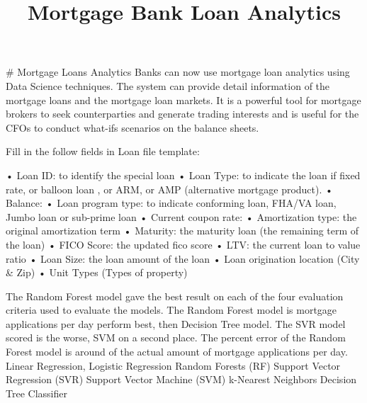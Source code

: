 \documentclass[11pt]{article}
\title{Mortgage Bank Loan Analytics}
\begin{document}
    
    
    \maketitle
    
    

    # Mortgage Loans Analytics
Banks can now use mortgage loan analytics using Data Science techniques. The system can provide detail information of the mortgage loans and the mortgage loan markets. It is a powerful tool for mortgage brokers to seek counterparties and generate trading interests and is useful for the CFOs to conduct what-ifs scenarios on the balance sheets.

Fill in the follow fields in Loan file template: 

•	Loan ID: to identify the special loan
•	Loan Type: to indicate the loan if fixed rate, or balloon loan , or ARM, or AMP (alternative mortgage product).
•	Balance:
•	Loan program type: to indicate conforming loan, FHA/VA loan, Jumbo loan or sub-prime loan
•	Current coupon rate:
•	Amortization type: the original amortization term
•	Maturity: the maturity loan (the remaining term of the loan)
•	FICO Score: the updated fico score
•	LTV: the current loan to value ratio
•	Loan Size: the loan amount of the loan
•	Loan origination location (City & Zip)
•	Unit Types (Types of property)

    The Random Forest model gave the best result on each of the four
evaluation criteria used to evaluate the models. The Random Forest model
is mortgage applications per day perform best, then Decision Tree model.
The SVR model scored is the worse, SVM on a second place. The percent
error of the Random Forest model is around of the actual amount of
mortgage applications per day. Linear Regression, Logistic Regression
Random Forests (RF) Support Vector Regression (SVR) Support Vector
Machine (SVM) k-Nearest Neighbors Decision Tree Classifier
\end{document}
